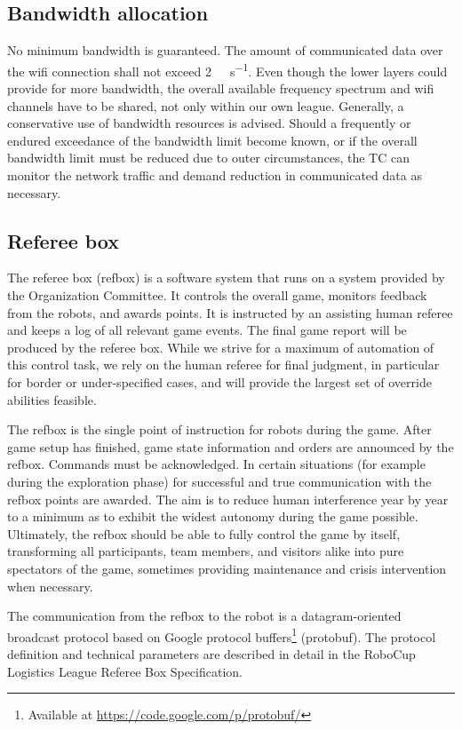 \documentclass[12pt,twoside]{article}
\begin{document}
\subsection{Bandwidth allocation}
\label{sec:bandwidth}
No minimum bandwidth is guaranteed. The amount of communicated data
over the wifi connection shall not exceed
\SI[per-mode=symbol]{2}{\mega\bit\per\second}. Even though the lower layers could
provide for more bandwidth, the overall available frequency spectrum
and wifi channels have to be shared, not only within our own
league. Generally, a conservative use of bandwidth resources is
advised. Should a frequently or endured exceedance of the bandwidth
limit become known, or if the overall bandwidth limit must be reduced
due to outer circumstances, the TC can monitor the network traffic and
demand reduction in communicated data as necessary.

\subsection{Referee box}
\label{sec:referee-box}
The referee box (refbox) is a software system that runs on a system
provided by the Organization Committee. It controls the overall game,
monitors feedback from the robots, and awards points. It is instructed
by an assisting human referee and keeps a log of all relevant game
events. The final game report will be produced by the referee
box. While we strive for a maximum of automation of this control task,
we rely on the human referee for final judgment, in particular for
border or under-specified cases, and will provide the largest set of
override abilities feasible.

The refbox is the single point of instruction for robots during the
game. After game setup has finished, game state information and orders
are announced by the refbox. Commands must be acknowledged. In certain
situations (for example during the exploration phase) for successful
and true communication with the refbox points are awarded. The aim is
to reduce human interference year by year to a minimum as to exhibit
the widest autonomy during the game possible. Ultimately, the refbox
should be able to fully control the game by itself, transforming all
participants, team members, and visitors alike into pure spectators of
the game, sometimes providing maintenance and crisis intervention when
necessary.

The communication from the refbox to the robot is a datagram-oriented
broadcast protocol based on Google protocol buffers\footnote{Available
  at \url{https://code.google.com/p/protobuf/}} (protobuf). The
protocol definition and technical parameters are described in detail
in the RoboCup Logistics League Referee Box Specification.
\end{document}
